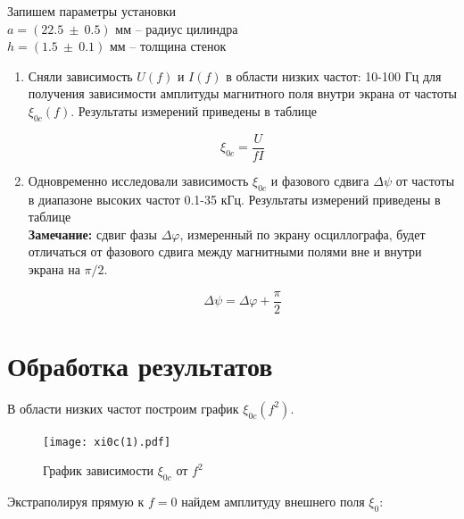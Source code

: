     \begin{center}
        Запишем параметры установки \\
        $a = (22.5 ~ \pm ~ 0.5)$ мм -- радиус цилиндра \\
        $h = (1.5 ~ \pm ~ 0.1)$ мм -- толщина стенок
    \end{center}

    \begin{enumerate}
        \item Сняли зависимость $U(f)$ и $I(f)$ в области низких частот: 10-100 Гц для получения зависимости
        амплитуды магнитного поля внутри экрана от частоты $\xi_{0c}(f)$. Результаты измерений приведены в таблице %

        \begin{equation}
            \xi_{0c} = \frac{U}{f I}
        \end{equation}

        \item Одновременно исследовали зависимость $\xi_{0c}$ и фазового сдвига $\Delta \psi$ от частоты в диапазоне высоких частот
        0.1-35 кГц. Результаты измерений приведены в таблице %
        \\

        \textbf{Замечание:} сдвиг фазы $\Delta \varphi$, измеренный по экрану осциллографа, будет отличаться от
        фазового сдвига между магнитными полями вне и внутри экрана на $\pi/2$.

        \[ \Delta \psi = \Delta \varphi + \frac{\pi}{2} \]
    \end{enumerate}

    

    

    \section*{Обработка результатов}

    В области низких частот построим график $\xi_{0c}(f^2)$.

    \begin{figure}[h!]
        \centering
        \texttt{[image: xi0c(1).pdf]}
        \caption{График зависимости $\xi_{0c}$ от $f^2$}
        \label{xi0c(1)}
    \end{figure}

    Экстраполируя прямую к $f = 0$ найдем амплитуду внешнего поля $\xi_0$:

